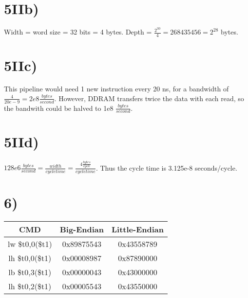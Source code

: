 \documentclass[a4paper,11pt]{article}
\begin{document}
\section*{5IIb)}

Width = word size = 32 bits = 4 bytes.  Depth = $\frac{2^30}{4} = 268435456 = 2^{28}$ bytes.  

\section*{5IIc)}
This pipeline would need 1 new
instruction every 20 ns, for a bandwidth of $\frac{4}{20e-9} = 2e8 \frac{bytes}{second}$.  However, DDRAM transfers twice the data with each read, so the bandwith could be halved to 1e8 $\frac{bytes}{second}$.

\section*{5IId)}
$128e6 \frac{bytes}{second} = \frac{width}{cycle time} = \frac{4 \frac{bytes}{cycle}}{cycle time}$.  Thus the cycle time is 3.125e-8 seconds/cycle.


\section*{6)}
\begin{tabular}{| c | c | c |}
  \hline	
  	CMD & Big-Endian & Little-Endian \\ \hline \hline
	lw \$t0,0(\$t1) & 0x89875543 & 0x43558789 \\ \hline
	lh \$t0,0(\$t1) & 0x00008987 & 0x87890000 \\ \hline
	lb \$t0,3(\$t1) & 0x00000043 & 0x43000000\\ \hline
	lh \$t0,2(\$t1) & 0x00005543 & 0x43550000 \\ \hline
\end{tabular} \\



\end{document}
